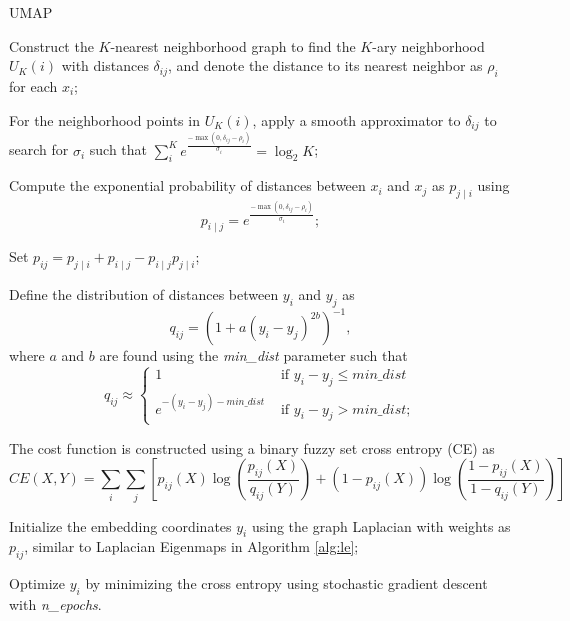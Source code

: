 \documentclass{article}
\begin{document}
\begin{algorithm}[!htb]
  \caption{UMAP}
  \label{alg:umap}
  \DontPrintSemicolon
  \SetAlgoLined
  \BlankLine
  \begin{algorithmic}[1]

  \STATE Construct the $K$-nearest neighborhood graph to find the $K$-ary neighborhood $U_K(i)$ with distances $\delta_{ij}$, and denote the distance to its nearest neighbor as $\rho_i$ for each $x_i$;

  \STATE For the neighborhood points in $U_K(i)$, apply a smooth approximator to $\delta_{ij}$ to search for $\sigma_i$ such that $\sum_{i}^K e^{\frac{- \max(0, \delta_{ij} -\rho_{i}) } {\sigma_{i}}} = \log_2{K}$;

  \STATE Compute the exponential probability of distances between $x_i$ and $x_j$ as $p_{j \mid i}$ using
  $$
    p_{i \mid j}=e^{\frac{-\max(0, \delta_{ij} -\rho_{i})}{\sigma_{i}}};
  $$

  \STATE Set $p_{i j}=p_{j \mid i}+p_{i \mid j} - p_{i \mid j} p_{j \mid i}$;

  \STATE Define the distribution of distances between $y_i$ and $y_j$ as
  $$
    q_{i j}=\left(1+a\left(y_{i}-y_{j}\right)^{2 b}\right)^{-1},
  $$
  where $a$ and $b$ are found using the \textit{min\_dist} parameter such that
  $$
      q_{i j} \approx\left\{\begin{array}{ll}
  1 & \text { if } y_{i}-y_{j} \leq \textit{min\_dist} \\
  e^{-\left(y_{i}-y_{j}\right)-\textit{min\_dist}} & \text { if } y_{i}-y_{j} > \textit{min\_dist};
  \end{array}\right.
  $$

  \STATE The cost function is constructed using a binary fuzzy set cross entropy (CE) as
  $$
    CE(X, Y)=\sum_{i} \sum_{j}\left[p_{i j}(X) \log \left(\frac{p_{i j}(X)}{q_{i j}(Y)}\right)+\left(1-p_{i j}(X)\right) \log \left(\frac{1-p_{i j}(X)}{1-q_{i j}(Y)}\right)\right]
  $$

  \STATE Initialize the embedding coordinates $y_i$ using the graph Laplacian with weights as $p_{ij}$, similar to Laplacian Eigenmaps in Algorithm \ref{alg:le};

  \STATE Optimize $y_i$ by minimizing the cross entropy using stochastic gradient descent with \textit{n\_epochs}.

  \end{algorithmic}
\end{algorithm}
\end{document}
